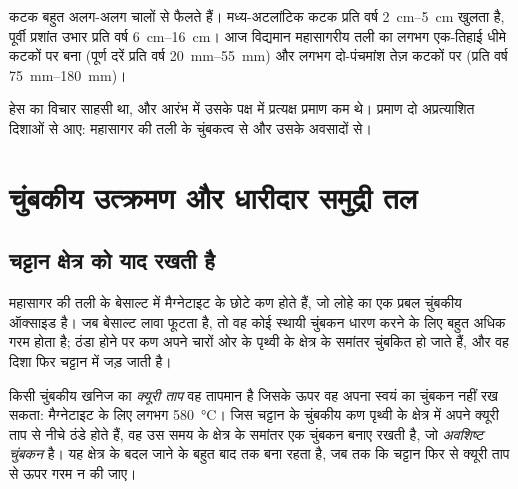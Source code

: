 कटक बहुत अलग-अलग चालों से फैलते हैं। मध्य-अटलांटिक कटक प्रति वर्ष
\qtyrange{2}{5}{cm} खुलता है, पूर्वी प्रशांत उभार प्रति वर्ष \qtyrange{6}{16}{cm}।
आज विद्यमान महासागरीय तली का लगभग एक-तिहाई धीमे
कटकों पर बना (पूर्ण दरें प्रति वर्ष \qtyrange{20}{55}{mm}) और लगभग दो-पंचमांश
तेज़ कटकों पर (प्रति वर्ष \qtyrange{75}{180}{mm})।

हेस का विचार साहसी था, और आरंभ में उसके पक्ष में प्रत्यक्ष प्रमाण कम थे। प्रमाण
दो अप्रत्याशित दिशाओं से आए: महासागर की तली के चुंबकत्व से और उसके
अवसादों से।

\section{चुंबकीय उत्क्रमण और धारीदार समुद्री तल}

\subsection{चट्टान क्षेत्र को याद रखती है}

महासागर की तली के बेसाल्ट में मैग्नेटाइट के छोटे कण होते हैं, जो लोहे का एक
प्रबल चुंबकीय ऑक्साइड है। जब बेसाल्ट लावा फूटता है, तो वह कोई स्थायी चुंबकन
धारण करने के लिए बहुत अधिक गरम होता है; ठंडा होने पर कण अपने चारों ओर के
पृथ्वी के क्षेत्र के समांतर चुंबकित हो जाते हैं, और वह दिशा फिर चट्टान में
जड़ जाती है।

\begin{definition}\label{def:g11:drift-to-spreading:remanence}
किसी चुंबकीय खनिज का \emph{क्यूरी ताप} वह
तापमान है जिसके ऊपर वह अपना स्वयं का चुंबकन नहीं रख सकता: मैग्नेटाइट के लिए लगभग
\qty{580}{\celsius}। जिस चट्टान के चुंबकीय कण पृथ्वी के क्षेत्र में अपने क्यूरी ताप से नीचे
ठंडे होते हैं, वह उस समय के क्षेत्र के समांतर एक चुंबकन बनाए रखती है, जो
\emph{अवशिष्ट चुंबकन} है। यह क्षेत्र के बदल जाने के बहुत बाद तक बना रहता है, जब तक कि चट्टान
फिर से क्यूरी ताप से ऊपर गरम न की जाए।
\end{definition}

